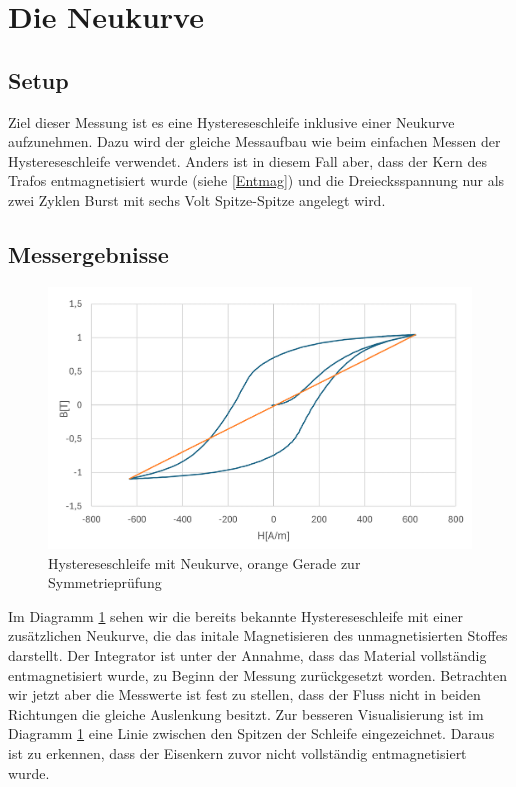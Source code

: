 \documentclass[a4paper,twoside,12pt,DIV=13,BCOR=5mm,numbers=noenddot,cleardoublepage=empty]{scrbook}
\begin{document}
        \section{Die Neukurve}\label{Neukurve}
        \subsection{Setup}
        Ziel dieser Messung ist es eine Hystereseschleife inklusive einer Neukurve aufzunehmen. 
        Dazu wird der gleiche Messaufbau wie beim einfachen Messen der Hystereseschleife verwendet. Anders ist in diesem Fall aber, dass der Kern des Trafos entmagnetisiert wurde (siehe \ref{Entmag}) und 
        die Dreiecksspannung nur als zwei Zyklen Burst mit sechs Volt Spitze-Spitze angelegt wird.
        \subsection{Messergebnisse}
        \begin{figure}
          \centering
          \includegraphics[width=0.9\linewidth]{pictures/Neukurve.png}
          \caption{Hystereseschleife mit Neukurve, orange Gerade zur Symmetriepr\"ufung}
          \label{fig:neukurve}
        \end{figure}
        Im Diagramm \ref{fig:neukurve} sehen wir die bereits bekannte Hystereseschleife mit einer zus\"atzlichen Neukurve, die das initale Magnetisieren des unmagnetisierten Stoffes darstellt.
         Der Integrator ist unter der Annahme, dass das Material vollst\"andig entmagnetisiert wurde, zu Beginn der Messung zur\"uckgesetzt worden. Betrachten wir jetzt aber die Messwerte ist fest zu stellen, dass der Fluss nicht 
         in beiden Richtungen die gleiche Auslenkung besitzt. Zur besseren Visualisierung ist im Diagramm \ref{fig:neukurve} eine Linie zwischen den Spitzen der Schleife eingezeichnet. 
         Daraus ist zu erkennen, dass der Eisenkern zuvor nicht vollst\"andig entmagnetisiert wurde. 
        
\end{document}
